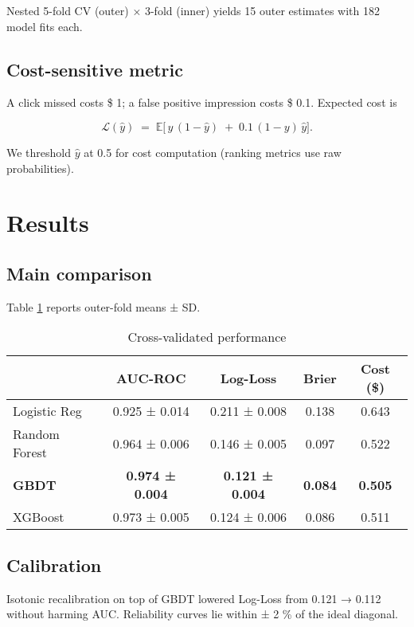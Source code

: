 \documentclass[12pt,a4paper]{article}
\begin{document}
Nested 5-fold CV (outer) × 3-fold (inner) yields 15 outer estimates with
182 model fits each.

\subsection{Cost-sensitive metric}
A click missed costs \$ 1; a false positive impression costs \$ 0.1.  
Expected cost is

\[
  \mathcal{L}(\hat y) \;=\;
    \mathbb{E}\bigl[\,y\,(1-\hat y)\;+\;0.1\,(1-y)\,\hat y\bigr].
\]

We threshold \(\hat y\) at 0.5 for cost computation (ranking metrics
use raw probabilities).

\section{Results} \label{sec:results}

\subsection{Main comparison}
Table \ref{tab:cv} reports outer-fold means ± SD.

\begin{table}[H]
  \centering
  \caption{Cross-validated performance}\label{tab:cv}
  \begin{tabular}{@{}lcccc@{}}
    \toprule
                & AUC-ROC & Log-Loss & Brier & Cost (\$) \\
    \midrule
    Logistic Reg & 0.925 ± 0.014 & 0.211 ± 0.008 & 0.138 & 0.643 \\
    Random Forest & 0.964 ± 0.006 & 0.146 ± 0.005 & 0.097 & 0.522 \\
    \textbf{GBDT} & \textbf{0.974 ± 0.004} & \textbf{0.121 ± 0.004} & \textbf{0.084} & \textbf{0.505} \\
    XGBoost       & 0.973 ± 0.005 & 0.124 ± 0.006 & 0.086 & 0.511 \\
    \bottomrule
  \end{tabular}
\end{table}

\subsection{Calibration}
Isotonic recalibration on top of GBDT lowered Log-Loss from 0.121 → 0.112
without harming AUC.  
Reliability curves lie within ± 2 \% of the ideal diagonal.
\end{document}
